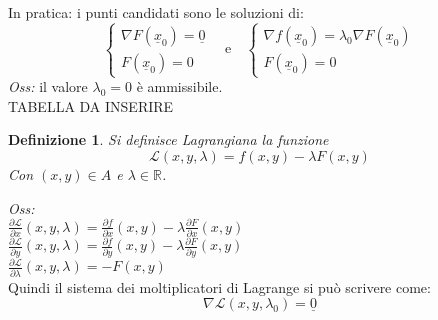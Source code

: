\documentclass{scrreprt}
\newtheorem{defn}{Definizione}
\newenvironment{definition}{\begin{mdframed}[backgroundcolor=Ivory2]\begin{defn}}{\end{defn}\end{mdframed}}
\begin{document}
In pratica: i punti candidati sono le soluzioni di:
\begin{equation}
	\begin{cases}
		\nabla F(\underline{x}_0) = \underline{0}\\
		F(\underline{x}_0) = 0
	\end{cases}
	\quad \text{e} \quad
	\begin{cases}
		\nabla f(\underline{x}_0) = \lambda_0 \nabla F(\underline{x}_0)\\
		F(\underline{x}_0) = 0
	\end{cases}
\end{equation}
\emph{Oss:} il valore $\lambda_0 = 0$ è ammissibile.\\


TABELLA DA INSERIRE\\

\begin{definition}
	Si definisce Lagrangiana la funzione
	\begin{equation}
		\mathcal{L} (x,y,\lambda) = f(x,y) - \lambda F(x,y)
	\end{equation}
	Con $(x,y)\in A$ e $\lambda \in \mathbb{R}$.
\end{definition}
\emph{Oss:}\\
			$\frac{\partial \mathcal{L} }{\partial x} (x,y,\lambda) = \frac{\partial f}{\partial x} (x,y) - \lambda \frac{\partial F}{\partial x} (x,y)$\\
			$\frac{\partial \mathcal{L} }{\partial y} (x,y,\lambda) = \frac{\partial f}{\partial y} (x,y) - \lambda \frac{\partial F}{\partial y} (x,y)$\\
			$\frac{\partial \mathcal{L} }{\partial \lambda} (x,y,\lambda) = -F(x,y)$\\
Quindi il sistema dei moltiplicatori di Lagrange si può scrivere come:
\begin{equation}
	\nabla \mathcal{L} (x,y,\lambda_0) = \underline{0}
\end{equation}
\end{document}

